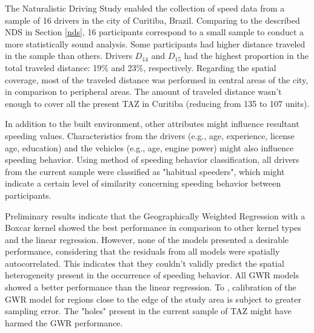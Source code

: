 




The Naturalistic Driving Study enabled the collection of speed data from a sample of 16 drivers in the city of Curitiba, Brazil. Comparing to the described NDS in Section \ref{nds}, 16 participants correspond to a small sample to conduct a more statistically sound analysis. Some participants had higher distance traveled in the sample than others. Drivers $D_{14}$ and $D_{15}$ had the highest proportion in the total traveled distance:  19\% and 23\%, respectively. Regarding the spatial coverage, most of the traveled distance was performed in central areas of the city, in comparison to peripheral areas. The amount of traveled distance wasn't enough to cover all the present TAZ in Curitiba (reducing from 135 to 107 units).

In addition to the built environment, other attributes might influence resultant speeding values. Characteristics from the drivers (e.g., age, experience, license age, education) and the vehicles (e.g., age, engine power) might also influence speeding behavior. Using \textcite{Richard2013a} method of speeding behavior classification, all drivers from the current sample were classified as "habitual speeders", which might indicate a certain level of similarity concerning speeding behavior between participants.

Preliminary results indicate that the Geographically Weighted Regression with a Boxcar kernel showed the best performance in comparison to other kernel types and the linear regression. However, none of the models presented a desirable performance, considering that the residuals from all models were spatially autocorrelated. This indicates that they couldn't validly predict the spatial heterogeneity present in the occurrence of speeding behavior. All GWR models showed a better performance than the linear regression. To \textcite{Brunsdon2010}, calibration of the GWR model for regions close to the edge of the study area is subject to greater sampling error. The "holes" present in the current sample of TAZ might have harmed the GWR performance. 

